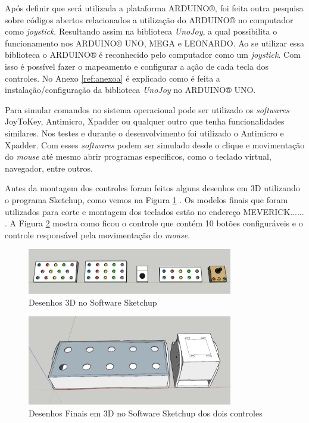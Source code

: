 \documentclass[
	12pt,			%
	openright,		%
	oneside,			%
	a4paper,			%
	chapter=TITLE,		%
	english,			%
	brazil,			%
	]{abntex2}
\begin{document}
Após definir que será utilizada a plataforma ARDUINO®, foi feita outra pesquisa sobre códigos abertos relacionados a utilização do ARDUINO® no computador como \emph{joystick}. Resultando assim na biblioteca \emph{UnoJoy}, a qual possibilita o funcionamento nos ARDUINO® UNO, MEGA e LEONARDO. Ao se utilizar essa biblioteca o ARDUINO® é reconhecido pelo computador como um \emph{joystick}. Com isso é possível fazer o mapeamento e configurar a ação de cada tecla dos controles. No Anexo \ref{ref:anexoa} é explicado como é feita a instalação/configuração da biblioteca \emph{UnoJoy} no ARDUINO® UNO.

Para simular comandos no sistema operacional pode ser utilizado os \emph{softwares} JoyToKey, Antimicro, Xpadder ou qualquer outro que tenha funcionalidades similares. Nos testes e durante o desenvolvimento foi utilizado o Antimicro e Xpadder. Com esses \emph{softwares} podem ser simulado desde o clique e movimentação do \emph{mouse} até mesmo abrir programas específicos, como o teclado virtual, navegador, entre outros.

Antes da montagem dos controles foram feitos alguns desenhos em 3D utilizando o programa Sketchup, como vemos na Figura \ref{img:img-20} . Os modelos finais que foram utilizados para corte e montagem dos teclados estão no endereço MEVERICK...... . A Figura \ref{img:img-17} mostra como ficou o controle que contém 10 botões configuráveis e o controle responsável pela movimentação do \emph{mouse}.

\begin{figure}[H]
	\centering
		\includegraphics[width=0.8\textwidth]{./img/img-20.png}
		\caption{Desenhos 3D no Software Sketchup}
		\label{img:img-20}
\end{figure}

\begin{figure}[H]
	\centering
		\includegraphics[width=0.8\textwidth]{./img/img-17.png}
		\caption{Desenhos Finais em 3D no Software Sketchup dos dois controles}
		\label{img:img-17}
\end{figure}
\end{document}
